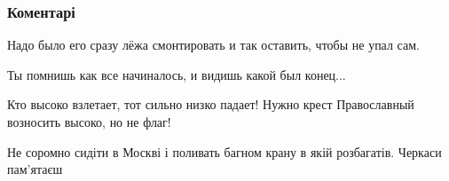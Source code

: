  
 
 
 
 
\subsubsection{Коментарі}
\label{sec:25_08_2021.fb.olejnik_vladimir.2.letaet_i_padaet.cmt}

\begin{itemize}
 
Надо было его сразу лёжа смонтировать и так оставить, чтобы не упал сам.

 
Ты помнишь как все начиналось, и видишь какой был конец...

 
Кто высоко взлетает, тот сильно низко падает! Нужно крест Православный возносить высоко, но не флаг!

 
Не соромно сидіти в Москві і поливать багном крану в якій розбагатів. Черкаси пам'ятаєш

 

\end{itemize}
